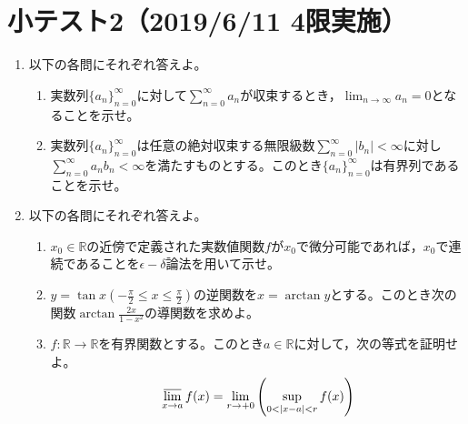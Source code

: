 \documentclass[dvipdfmx,a4j,10pt]{jsarticle}
\theoremstyle{mystyle1}
\theoremstyle{mystyle2}
\begin{document}
\section*{小テスト2（2019/6/11 4限実施）}
\begin{enumerate}
\item 以下の各問にそれぞれ答えよ。
\begin{enumerate}
\renewcommand{\labelenumii}{(\arabic{enumii})}
\item 実数列$\{a_n\}_{n=0}^\infty$に対して$\displaystyle\sum_{n=0}^\infty a_n$が収束するとき，$\displaystyle\lim_{n\to\infty}a_n=0$となることを示せ。
\item 実数列$\{a_n\}_{n=0}^\infty$は任意の絶対収束する無限級数$\displaystyle\sum_{n=0}^\infty |b_n|<\infty$に対し$\displaystyle\sum_{n=0}^\infty a_nb_n<\infty$を満たすものとする。このとき$\{a_n\}_{n=0}^\infty$は有界列であることを示せ。
\end{enumerate}
\item 以下の各問にそれぞれ答えよ。
\begin{enumerate}
\renewcommand{\labelenumii}{(\arabic{enumii})}
\item $x_0\in\mathbb{R}$の近傍で定義された実数値関数$f$が$x_0$で微分可能であれば，$x_0$で連続であることを$\epsilon-\delta$論法を用いて示せ。
\item $y=\tan{x}$$\displaystyle\left(-\frac{\pi}{2}\leq x\leq\frac{\pi}{2}\right)$の逆関数を$x=\arctan y$とする。このとき次の関数$\displaystyle\arctan{\frac{2x}{1-x^2}}$の導関数を求めよ。
\item $f:\mathbb{R}\to\mathbb{R}$を有界関数とする。このとき$a\in\mathbb{R}$に対して，次の等式を証明せよ。
\[
\varlimsup_{x\to a}f(x)=\lim_{r\to+0}\left(\sup_{0<|x-a|<r}f(x)\right)
\]
\end{enumerate}
\end{enumerate}
\end{document}
